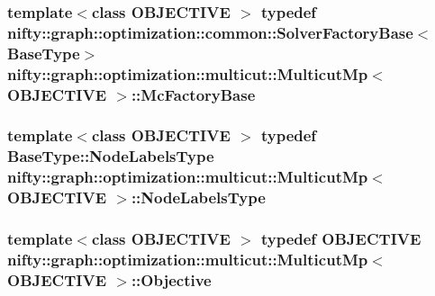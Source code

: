 \subsubsection[{Mc\+Factory\+Base}]{\setlength{\rightskip}{0pt plus 5cm}template$<$class O\+B\+J\+E\+C\+T\+I\+V\+E $>$ typedef {\bf nifty\+::graph\+::optimization\+::common\+::\+Solver\+Factory\+Base}$<${\bf Base\+Type}$>$ {\bf nifty\+::graph\+::optimization\+::multicut\+::\+Multicut\+Mp}$<$ O\+B\+J\+E\+C\+T\+I\+V\+E $>$\+::{\bf Mc\+Factory\+Base}}\label{classnifty_1_1graph_1_1optimization_1_1multicut_1_1MulticutMp_a43262185c61afcc95eb125ac9d6d0305}
\hypertarget{classnifty_1_1graph_1_1optimization_1_1multicut_1_1MulticutMp_a4f01b08f609bb54b19098452e1f8bef6}{}
\subsubsection[{Node\+Labels\+Type}]{\setlength{\rightskip}{0pt plus 5cm}template$<$class O\+B\+J\+E\+C\+T\+I\+V\+E $>$ typedef {\bf Base\+Type\+::\+Node\+Labels\+Type} {\bf nifty\+::graph\+::optimization\+::multicut\+::\+Multicut\+Mp}$<$ O\+B\+J\+E\+C\+T\+I\+V\+E $>$\+::{\bf Node\+Labels\+Type}}\label{classnifty_1_1graph_1_1optimization_1_1multicut_1_1MulticutMp_a4f01b08f609bb54b19098452e1f8bef6}
\hypertarget{classnifty_1_1graph_1_1optimization_1_1multicut_1_1MulticutMp_ad37cbde154954a78f5529f35def24443}{}
\subsubsection[{Objective}]{\setlength{\rightskip}{0pt plus 5cm}template$<$class O\+B\+J\+E\+C\+T\+I\+V\+E $>$ typedef O\+B\+J\+E\+C\+T\+I\+V\+E {\bf nifty\+::graph\+::optimization\+::multicut\+::\+Multicut\+Mp}$<$ O\+B\+J\+E\+C\+T\+I\+V\+E $>$\+::{\bf Objective}}\label{classnifty_1_1graph_1_1optimization_1_1multicut_1_1MulticutMp_ad37cbde154954a78f5529f35def24443}
\hypertarget{classnifty_1_1graph_1_1optimization_1_1multicut_1_1MulticutMp_a9f5b323f0e6ed2481e20fb12309b3451}{}
